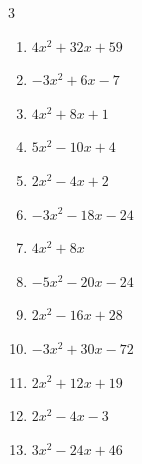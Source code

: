 \begin{multicols}{3}
\begin{enumerate}

  \item $4x^{2}+32x+59$


  \item $-3x^{2}+6x-7$


  \item $4x^{2}+8x+1$


  \item $5x^{2}-10x+4$


\columnbreak %

  \item $2x^{2}-4x+2$


  \item $-3x^{2}-18x-24$


  \item $4x^{2}+8x$


  \item $-5x^{2}-20x-24$


  \item $2x^{2}-16x+28$


  \item $-3x^{2}+30x-72$


  \item $2x^{2}+12x+19$


  \item $2x^{2}-4x-3$


  \item $3x^{2}-24x+46$



\end{enumerate}
\end{multicols}
